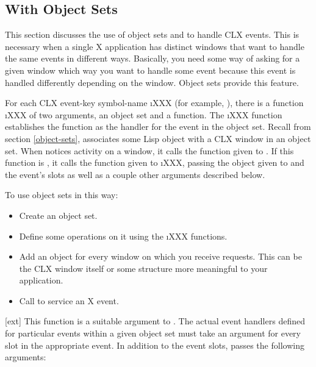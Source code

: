 {\subsection{With Object Sets}
This section discusses the use of object sets and  to
handle CLX events.  This is necessary when a single X application has distinct
windows that want to handle the same events in different ways.  Basically, you
need some way of asking for a given window which way you want to handle some
event because this event is handled differently depending on the window.
Object sets provide this feature.

For each CLX event-key symbol-name \i{XXX} (for example, ), there
is a function \i{XXX} of two arguments, an object set and a function.
The \i{XXX} function establishes the function as the handler for the
 event in the object set.  Recall from section \ref{object-sets},
 associates some Lisp object with a CLX window in
an object set.  When  notices activity on a window, it
calls the function given to .  If this
function is , it calls the function given to
\i{XXX}, passing the object given to 
and the event's slots as well as a couple other arguments described below.

To use object sets in this way:
\begin{itemize}

\item
Create an object set.

\item
Define some operations on it using the \i{XXX} functions.

\item
Add an object for every window on which you receive requests.  This can be the
CLX window itself or some structure more meaningful to your application.

\item
Call  to service an X event.
\end{itemize}


[ext]{}
This function is a suitable argument to .  The
actual event handlers defined for particular events within a given object set
must take an argument for every slot in the appropriate event.  In addition to
the event slots,  passes the following
arguments: 
\begin{itemize}


\end{itemize}}
